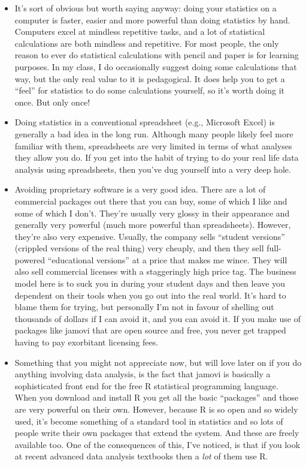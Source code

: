 \documentclass[
]{book}
\begin{document}
\begin{itemize}
\item
  It's sort of obvious but worth saying anyway: doing your statistics on a computer is faster, easier and more powerful than doing statistics by hand. Computers excel at mindless repetitive tasks, and a lot of statistical calculations are both mindless and repetitive. For most people, the only reason to ever do statistical calculations with pencil and paper is for learning purposes. In my class, I do occasionally suggest doing some calculations that way, but the only real value to it is pedagogical. It does help you to get a ``feel'' for statistics to do some calculations yourself, so it's worth doing it once. But only once!
\item
  Doing statistics in a conventional spreadsheet (e.g., Microsoft Excel) is generally a bad idea in the long run. Although many people likely feel more familiar with them, spreadsheets are very limited in terms of what analyses they allow you do. If you get into the habit of trying to do your real life data analysis using spreadsheets, then you've dug yourself into a very deep hole.
\item
  Avoiding proprietary software is a very good idea. There are a lot of commercial packages out there that you can buy, some of which I like and some of which I don't. They're usually very glossy in their appearance and generally very powerful (much more powerful than spreadsheets). However, they're also very expensive. Usually, the company sells ``student versions'' (crippled versions of the real thing) very cheaply, and then they sell full-powered ``educational versions'' at a price that makes me wince. They will also sell commercial licenses with a staggeringly high price tag. The business model here is to suck you in during your student days and then leave you dependent on their tools when you go out into the real world. It's hard to blame them for trying, but personally I'm not in favour of shelling out thousands of dollars if I can avoid it, and you can avoid it. If you make use of packages like jamovi that are open source and free, you never get trapped having to pay exorbitant licensing fees.
\item
  Something that you might not appreciate now, but will love later on if you do anything involving data analysis, is the fact that jamovi is basically a sophisticated front end for the free R statistical programming language. When you download and install R you get all the basic ``packages'' and those are very powerful on their own. However, because R is so open and so widely used, it's become something of a standard tool in statistics and so lots of people write their own packages that extend the system. And these are freely available too. One of the consequences of this, I've noticed, is that if you look at recent advanced data analysis textbooks then a \emph{lot} of them use R.
\end{itemize}
\end{document}
